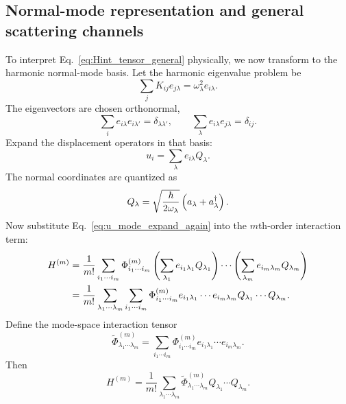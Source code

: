 \subsection{Normal-mode representation and general scattering channels}
To interpret Eq.~\eqref{eq:Hint_tensor_general} physically, we now transform to the harmonic normal-mode basis. Let the harmonic eigenvalue problem be
\begin{equation}
    \sum_j K_{ij}e_{j\lambda} = \omega_\lambda^2 e_{i\lambda}.
    \label{eq:harmonic_mode_eigenproblem}
\end{equation}
The eigenvectors are chosen orthonormal,
\begin{equation}
    \sum_i e_{i\lambda}e_{i\lambda'} = \delta_{\lambda\lambda'},
    \qquad
    \sum_\lambda e_{i\lambda}e_{j\lambda} = \delta_{ij}.
    \label{eq:harmonic_mode_orthogonality}
\end{equation}
Expand the displacement operators in that basis:
\begin{equation}
    u_i = \sum_\lambda e_{i\lambda}Q_\lambda.
    \label{eq:u_mode_expand_again}
\end{equation}
The normal coordinates are quantized as
\begin{equation}
    Q_\lambda = \sqrt{\frac{\hbar}{2\omega_\lambda}}\left( a_\lambda + a_\lambda^\dagger \right).
    \label{eq:normal_coordinate_quantization_again}
\end{equation}
Now substitute Eq.~\eqref{eq:u_mode_expand_again} into the $m$th-order interaction term:
\begin{align}
    H^{(m)}
    &=
    \frac{1}{m!}\sum_{i_1\cdots i_m}\Phi^{(m)}_{i_1\cdots i_m}
    \left( \sum_{\lambda_1}e_{i_1\lambda_1}Q_{\lambda_1} \right)
    \cdots
    \left( \sum_{\lambda_m}e_{i_m\lambda_m}Q_{\lambda_m} \right) \\
    &=
    \frac{1}{m!}
    \sum_{\lambda_1\cdots \lambda_m}
    \sum_{i_1\cdots i_m}
    \Phi^{(m)}_{i_1\cdots i_m}
    e_{i_1\lambda_1}\cdots e_{i_m\lambda_m}
    Q_{\lambda_1}\cdots Q_{\lambda_m}.
\end{align}
Define the mode-space interaction tensor
\begin{equation}
    \widetilde\Phi^{(m)}_{\lambda_1\cdots \lambda_m}
    =
    \sum_{i_1\cdots i_m}
    \Phi^{(m)}_{i_1\cdots i_m}
    e_{i_1\lambda_1}\cdots e_{i_m\lambda_m}.
    \label{eq:mode_ifc_not_yet_quantized}
\end{equation}
Then
\begin{equation}
    H^{(m)} = \frac{1}{m!}\sum_{\lambda_1\cdots \lambda_m}\widetilde\Phi^{(m)}_{\lambda_1\cdots \lambda_m}Q_{\lambda_1}\cdots Q_{\lambda_m}.
    \label{eq:mode_hamiltonian_before_aadag}
\end{equation}
